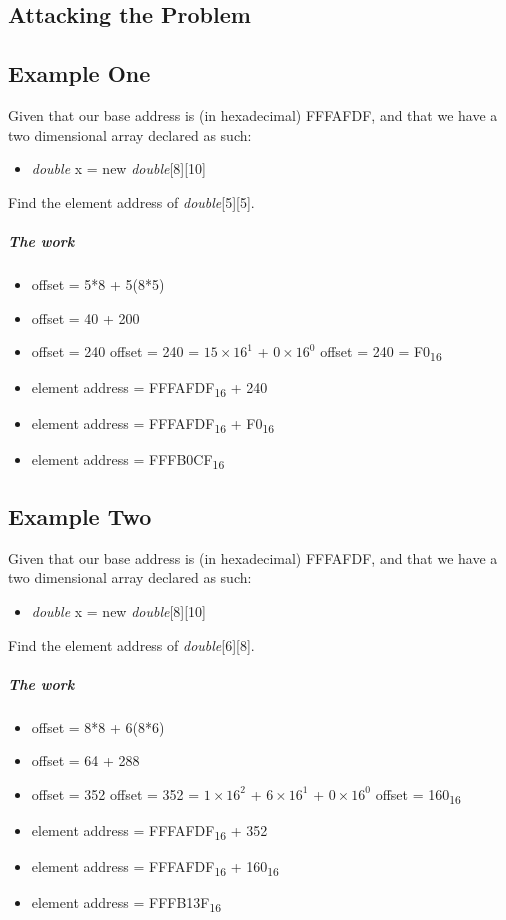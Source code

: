 \documentclass[12pt]{article}
\begin{document}
\newpage %



\begin{center}
\section{Attacking the Problem}
\end{center}
\subsection{Example One}
Given that our base address is (in hexadecimal) FFFAFDF, and that we have a two dimensional array declared as such:
\begin{itemize}[leftmargin=1.5em]
\item[] \textit{double} x = new \textit{double}[8][10]
\end{itemize}
Find the element address of \textit{double}[5][5].
\subparagraph{The work}
\begin{itemize}[leftmargin=1.5em]
\item[] offset = 5*8 + 5(8*5)
\item[] offset = 40 + 200
\item[] offset = 240
\subitem offset = 240 = $15\times16^1$ + $0\times16^0$
\subitem offset = 240 = F0\textsubscript{16}
\item[] element address = FFFAFDF\textsubscript{16} + 240
\item[] element address = FFFAFDF\textsubscript{16} + F0\textsubscript{16}
\item[] element address = FFFB0CF\textsubscript{16}
\end{itemize}

\subsection{Example Two}
Given that our base address is (in hexadecimal) FFFAFDF, and that we have a two dimensional array declared as such:
\begin{itemize}[leftmargin=1.5em]
\item[] \textit{double} x = new \textit{double}[8][10]
\end{itemize}
Find the element address of \textit{double}[6][8].
\subparagraph{The work}
\begin{itemize}[leftmargin=1.5em]
\item[] offset = 8*8 + 6(8*6)
\item[] offset = 64 + 288
\item[] offset = 352
\subitem offset = 352 = $1\times16^2$ + $6\times16^1$ + $0\times16^0$
\subitem offset = 160\textsubscript{16}
\item[] element address = FFFAFDF\textsubscript{16} + 352
\item[] element address = FFFAFDF\textsubscript{16} + 160\textsubscript{16}
\item[] element address = FFFB13F\textsubscript{16}
\end{itemize}
\end{document}
